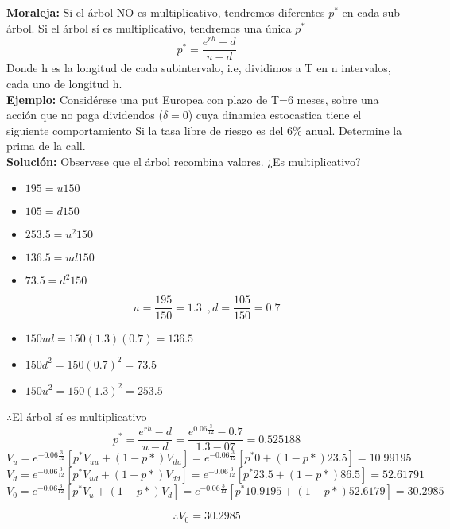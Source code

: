 \documentclass[12pts]{extarticle}
\begin{document}
\textbf{Moraleja:} Si el árbol NO es multiplicativo, tendremos diferentes $p^{*}$ en cada sub-árbol. Si el árbol sí es multiplicativo, tendremos una única $p^{*}$ 
$$p^{*}= \frac{e^{rh}-d}{u-d}$$
Donde h es la longitud de cada subintervalo, i.e, dividimos a T en n intervalos, cada uno de longitud h.  \\

\textbf{Ejemplo:} Considérese una put Europea con plazo de T=6 meses, sobre una acción que no paga dividendos ($\delta=0$) cuya dinamica estocastica tiene el siguiente comportamiento
Si la tasa libre de riesgo es del 6\% anual. Determine la prima de la call. 
\\ 
\textbf{Solución:} Observese que el árbol recombina valores. ¿Es multiplicativo? 
\begin{itemize}
\item $195=u150$
\item $105=d150$
\item $253.5=u^{2}150$
\item $136.5=ud150$
\item $73.5 =d^2 150$
\end{itemize}
$$u=\frac{195}{150}=1.3 \, \, \, , d= \frac{105}{150}=0.7$$ 
\begin{itemize}
\item $150ud=150(1.3)(0.7)=136.5$
\item $150 d^2=150(0.7)^2=73.5$
\item $150 u^2=150(1.3)^2=253.5$
\end{itemize}
$ \therefore $El  árbol  sí  es  multiplicativo 
$$p^{*}=\frac{e^{rh}-d}{u-d}=\frac{e^{0.06 \frac{3}{12}}-0.7}{1.3-07}=0.525188$$
$$V_u=e^{-0.06 \frac{3}{12}}[p^{*}V_{uu}+(1-p{*})V_{du}]=e^{-0.06 \frac{3}{12}}[p^{*}0+(1-p{*})23.5]=10.99195$$
$$V_d=e^{-0.06 \frac{3}{12}}[p^{*}V_{ud}+(1-p{*})V_{dd}]=e^{-0.06 \frac{3}{12}}[p^{*}23.5+(1-p{*})86.5]=52.61791$$
$$V_0=e^{-0.06 \frac{3}{12}}[p^{*}V_{u}+(1-p{*})V_{d}]=e^{-0.06 \frac{3}{12}}[p^{*}10.9195+(1-p{*})52.6179]=30.2985$$

$$\therefore V_0=30.2985$$ 
\end{document}
